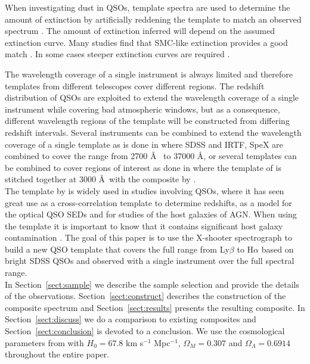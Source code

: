 \documentclass{aa}    %
\newcommand{\sectionname}{Section}
\newcommand{\Sect}[1]{\sectionname~\ref{sect:#1}}
\newcommand{\sect}[1]{\Sect{#1}}
\begin{document}
When investigating dust in QSOs, template spectra are used to determine the
amount of extinction by artificially reddening the template 
to match an observed spectrum 
\citep[e.g.,][]{Glikman2007,Urrutia2009,Wang2012,Fynbo2013,Krogager2015}. 
The amount of extinction inferred will depend on the
assumed extinction curve. Many studies find that SMC-like extinction provides
a good match \citep{Richards2003,Hopkins2004}. In some cases steeper extinction
curves are required \citep{Fynbo2013,Jiang2013,Leighly2014}.

The wavelength coverage of a single instrument is always limited and therefore
templates from different telescopes cover different regions. The redshift
distribution of QSOs are exploited to extend the wavelength coverage of a
single instrument while covering bad atmospheric windows, but as a consequence, different wavelength regions of the template will be constructed from differing
redshift intervals. Several instruments can be combined to extend the wavelength
coverage of a single template as is done in \citet{Glikman2006} where SDSS\citep{Gunn2006} and IRTF, SpeX\citep{Rayner2003} are combined to
cover the range from 2700 \AA~ to 37000 \AA, or several templates can be
combined to cover regions of interest as done in \citep{Zhou2010} where the
template of \citet{VandenBerk2001} is stitched together at 3000
\AA~with the composite by \citet{Glikman2006}. \\
The template by \citet{VandenBerk2001} is widely
used in studies involving QSOs, where it has seen great use as a
cross-correlation template to determine redshifts\citep{Stoughton2002, Rafiee2011}, as a model for the optical QSO SEDs\citep{Croom2004, Hopkins2006, Hopkins2007} and for studies of the host galaxies of AGN\citep{Kauffmann2003b}. When using the \citet{VandenBerk2001} template
it is important to know that it contains significant host galaxy contamination
\citep[e.g.,][their Fig.~5]{Fynbo2013}. The goal of this paper is to use the X-shooter spectrograph to build a new QSO template that covers the full range from Ly$\beta$ to H$\alpha$ based on bright
SDSS QSOs and observed with a single instrument over the full spectral range. \\
In \sect{sample} we describe the sample selection and provide the details 
of the observations. \sect{construct} describes the construction of the composite spectrum
and \sect{results} presents the resulting composite. In \sect{discuss} we do a
comparison to existing composites and \sect{conclusion} is devoted to a
conclusion. We use the cosmological parameters from \citet{Planck2014} with $H_{0} = 67.8$ km s$^{-1}$ Mpc$^{-1}$, $\Omega_{M} = 0.307$ and $\Omega_{\Lambda} = 0.6914$ throughout the entire paper. 
\end{document}
